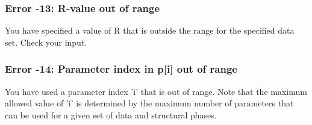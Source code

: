 \subsubsection{Error -13: R-value out of range}
\par
You have specified a value of R that is outside the range for the 
specified data set. Check your input. 
\subsubsection{Error -14: Parameter index in p[i] out of range}
\par
You have used a parameter index 'i' that is out of range. Note that 
the maximum allowed value of 'i' is determined by the maximum number 
of parameters that can be used for a given set of data and structural 
phases. 
